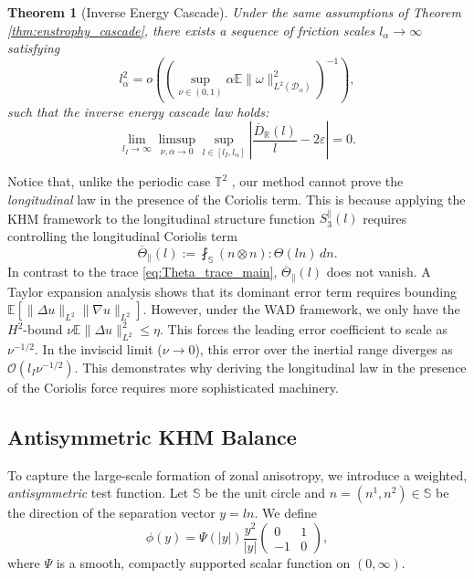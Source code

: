 \documentclass[11pt,a4paper]{article}
\numberwithin{equation}{section}
\newtheorem{theorem}{Theorem}%
\numberwithin{theorem}{section}
\numberwithin{remark}{section}
\numberwithin{definition}{section}
\begin{document}
\begin{theorem}[Inverse Energy Cascade]\label{thm:inverse_cascade} 
Under the same assumptions of Theorem \ref{thm:enstrophy_cascade}, there exists
a sequence of friction scales $l_\alpha \to \infty$ satisfying
\begin{equation}\label{eq:friction_scale_WAD}
    l_\alpha^2 = o\left(\left(\sup_{\nu\in(0,1)}\alpha\mathbb{E}\|\omega\|_{L^2(\mathcal{D}_\alpha)}^2\right)^{-1}\right), 
\end{equation}
such that the inverse energy cascade law holds:
\begin{equation}\label{eq:cascade_energy_inverse}
    \lim_{l_I \to \infty} \limsup_{\nu,\alpha \to 0}  \sup_{l \in [l_I, l_\alpha]} \left| \frac{\overline{D}_{\mathbb{R}}(l)}{l} - 2\varepsilon \right| = 0.
\end{equation}
\end{theorem}




Notice that, unlike the periodic case $\mathbb{T}^2$ \cite{bed2D}, our method cannot prove the \textit{longitudinal} law in the presence of the Coriolis term. This is because applying the KHM framework to the longitudinal structure function $S_3^{\parallel}(l)$ requires controlling the longitudinal Coriolis term
\begin{equation}
    \overline{\varTheta}_{\parallel}(l) := \fint_\mathbb{S} (n \otimes n) : \varTheta(ln) \, dn.
\end{equation}
In contrast to the trace \eqref{eq:Theta_trace_main}, $\overline{\varTheta}_{\parallel}(l)$ does not vanish. A Taylor expansion analysis shows that its dominant error term requires bounding $\mathbb{E}[\|\Delta u\|_{L^2}\|\nabla u\|_{L^2}]$. However, under the WAD framework, we only have the $H^2$-bound $\nu \mathbb{E}\|\Delta u\|_{L^2}^2 \le \eta$. This forces the leading error coefficient to scale as $\nu^{-1/2}$. In the inviscid limit ($\nu \to 0$), this error over the inertial range diverges as $\mathcal{O}(l_I \nu^{-1/2})$. This demonstrates why  deriving the longitudinal law in the presence of the Coriolis force requires more sophisticated machinery.


\subsection{Antisymmetric KHM Balance}\label{sec:khm_anti}

To capture the large-scale formation of zonal anisotropy, we introduce a weighted, \textit{antisymmetric} test function. Let $\mathbb{S}$ be the unit circle and $n = (n^1, n^2) \in \mathbb{S}$ be the direction of the separation vector $y = l n$. We define 
\begin{equation}\label{eq:test_function}
    \phi(y) = \Psi(|y|)\frac{y^2}{|y|} \begin{pmatrix} 0 & 1 \\ -1 & 0 \end{pmatrix},
\end{equation}
where $\Psi$ is a smooth, compactly supported scalar function on $(0, \infty)$. 
\end{document}
